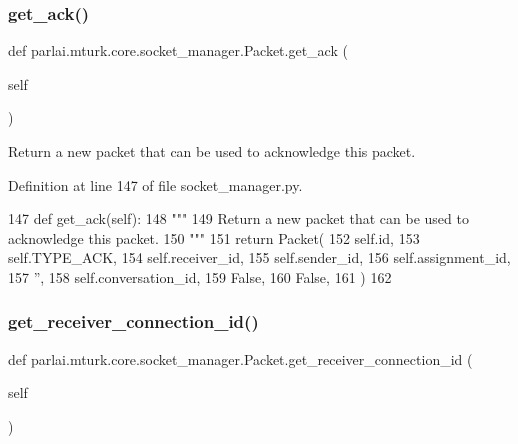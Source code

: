 \subsubsection{\texorpdfstring{get\+\_\+ack()}{get\_ack()}}
{\footnotesize\ttfamily def parlai.\+mturk.\+core.\+socket\+\_\+manager.\+Packet.\+get\+\_\+ack (\begin{DoxyParamCaption}\item[{}]{self }\end{DoxyParamCaption})}

\begin{DoxyVerb}Return a new packet that can be used to acknowledge this packet.
\end{DoxyVerb}
 

Definition at line 147 of file socket\+\_\+manager.\+py.


\begin{DoxyCode}
147     \textcolor{keyword}{def }get\_ack(self):
148         \textcolor{stringliteral}{"""}
149 \textcolor{stringliteral}{        Return a new packet that can be used to acknowledge this packet.}
150 \textcolor{stringliteral}{        """}
151         \textcolor{keywordflow}{return} Packet(
152             self.id,
153             self.TYPE\_ACK,
154             self.receiver\_id,
155             self.sender\_id,
156             self.assignment\_id,
157             \textcolor{stringliteral}{''},
158             self.conversation\_id,
159             \textcolor{keyword}{False},
160             \textcolor{keyword}{False},
161         )
162 
\end{DoxyCode}
\mbox{\label{classparlai_1_1mturk_1_1core_1_1socket__manager_1_1Packet_af13faca81d70ad1768e6dd0089c8e082}} 
\subsubsection{\texorpdfstring{get\+\_\+receiver\+\_\+connection\+\_\+id()}{get\_receiver\_connection\_id()}}
{\footnotesize\ttfamily def parlai.\+mturk.\+core.\+socket\+\_\+manager.\+Packet.\+get\+\_\+receiver\+\_\+connection\+\_\+id (\begin{DoxyParamCaption}\item[{}]{self }\end{DoxyParamCaption})}

